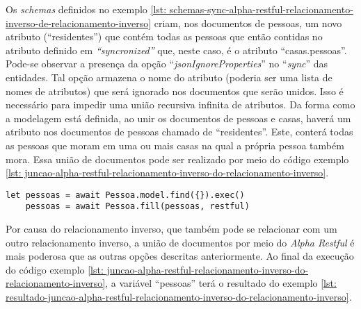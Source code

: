Os \textit{schemas} definidos no exemplo \ref{lst: schemas-sync-alpha-restful-relacionamento-inverso-de-relacionamento-inverso} criam, nos documentos de pessoas, um novo atributo (``residentes'') que contém todas as pessoas que então contidas no atributo definido em \textit{``syncronized''} que, neste caso, é o atributo ``casas.pessoas''. Pode-se observar a presença da opção ``\textit{jsonIgnoreProperties}'' no ``\textit{sync}'' das entidades. Tal opção armazena o nome do atributo (poderia ser uma lista de nomes de atributos) que será ignorado nos documentos que serão unidos. Isso é necessário para impedir uma união recursiva infinita de atributos. Da forma como a modelagem está definida, ao unir os documentos de pessoas e casas, haverá um atributo nos documentos de pessoas chamado de ``residentes''. Este, conterá todas as pessoas que moram em uma ou mais casas na qual a própria pessoa também mora. Essa união de documentos pode ser realizado por meio do código exemplo \ref{lst: juncao-alpha-restful-relacionamento-inverso-do-relacionamento-inverso}.

\begin{lstlisting}[style=ES6, caption={Junção de Documentos Com o \textit{Alpha Restful}\label{lst: juncao-alpha-restful-relacionamento-inverso-do-relacionamento-inverso}}]
	let pessoas = await Pessoa.model.find({}).exec()
	pessoas = await Pessoa.fill(pessoas, restful)
\end{lstlisting}

Por causa do relacionamento inverso, que também pode se relacionar com um outro relacionamento inverso, a união de documentos por meio do \textit{Alpha Restful} é mais poderosa que as outras opções descritas anteriormente. Ao final da execução do código exemplo \ref{lst: juncao-alpha-restful-relacionamento-inverso-do-relacionamento-inverso}, a variável ``pessoas'' terá o resultado do exemplo \ref{lst: resultado-juncao-alpha-restful-relacionamento-inverso-do-relacionamento-inverso}.

